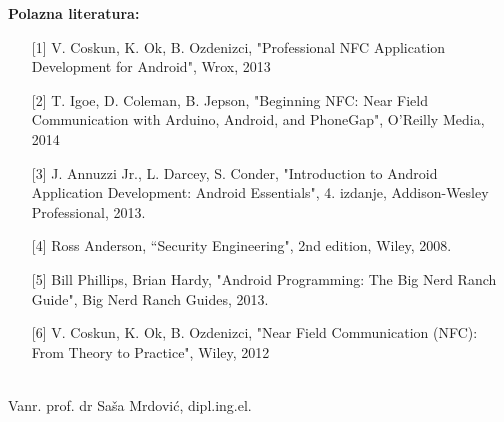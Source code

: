 \vspace{0.5cm}
\textbf{Polazna literatura:}

\begin{itemize}
\item[] [1] V. Coskun, K. Ok, B. Ozdenizci, "Professional NFC Application Development for Android", Wrox, 2013
\item[] [2] T. Igoe, D. Coleman, B. Jepson, "Beginning NFC: Near Field Communication with Arduino, Android, and PhoneGap", O'Reilly Media, 2014
\item[] [3] J. Annuzzi Jr., L. Darcey, S. Conder, "Introduction to Android Application Development: Android Essentials", 4. izdanje, Addison-Wesley Professional, 2013.
\item[] [4] Ross Anderson, “Security Engineering", 2nd edition, Wiley, 2008.
\item[] [5] Bill Phillips, Brian Hardy, "Android Programming: The Big Nerd Ranch Guide", Big Nerd Ranch Guides, 2013.
\item[] [6] V. Coskun, K. Ok, B. Ozdenizci, "Near Field Communication (NFC): From Theory to Practice", Wiley, 2012
\end{itemize}

\begin{center}
\vspace{1cm}
\makebox[8cm]{\hrulefill} \\
Vanr. prof. dr Saša Mrdović, dipl.ing.el.\\
\end{center}





